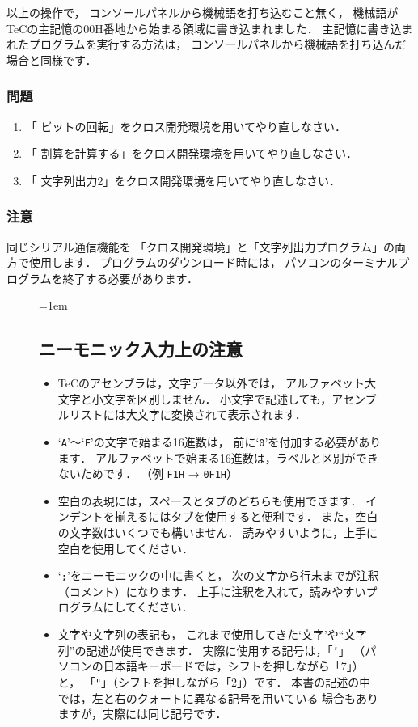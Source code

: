 以上の操作で，
コンソールパネルから機械語を打ち込むこと無く，
機械語がTeCの主記憶の00H番地から始まる領域に書き込まれました．
主記憶に書き込まれたプログラムを実行する方法は，
コンソールパネルから機械語を打ち込んだ場合と同様です．

\newpage
\subsubsection{問題}
\begin{enumerate}
\item 「 ビットの回転」をクロス開発環境を用いてやり直しなさい．
\item 「 割算を計算する」をクロス開発環境を用いてやり直しなさい．
\item 「 文字列出力2」をクロス開発環境を用いてやり直しなさい．
\end{enumerate}

\subsubsection{注意}
同じシリアル通信機能を
「クロス開発環境」と「文字列出力プログラム」の両方で使用します．
プログラムのダウンロード時には，
パソコンのターミナルプログラムを終了する必要があります．

\begin{figure}[btp]
\begin{framed}{\parindent=1em
\subsection*{ニーモニック入力上の注意}

\begin{itemize}
\item TeCのアセンブラは，文字データ以外では，
アルファベット大文字と小文字を区別しません．
小文字で記述しても，アセンブルリストには大文字に変換されて表示されます．
\item `{\tt A}'〜`{\tt F}'の文字で始まる16進数は，
前に`{\tt 0}'を付加する必要があります．
アルファベットで始まる16進数は，ラベルと区別ができないためです．
（例 {\tt F1H} → {\tt 0F1H}）
\item 空白の表現には，スペースとタブのどちらも使用できます．
インデントを揃えるにはタブを使用すると便利です．
また，空白の文字数はいくつでも構いません．
読みやすいように，上手に空白を使用してください．
\item `{\tt ;}'をニーモニックの中に書くと，
次の文字から行末までが注釈（コメント）になります．
上手に注釈を入れて，読みやすいプログラムにしてください．
\item 文字や文字列の表記も，
これまで使用してきた`文字'や``文字列''の記述が使用できます．
実際に使用する記号は，「{\tt '}」
（パソコンの日本語キーボードでは，シフトを押しながら「7」）と，
「{\tt "}」（シフトを押しながら「2」）です．
本書の記述の中では，左と右のクォートに異なる記号を用いている
場合もありますが，実際には同じ記号です．
\end{itemize}
}\end{framed}
\end{figure}

